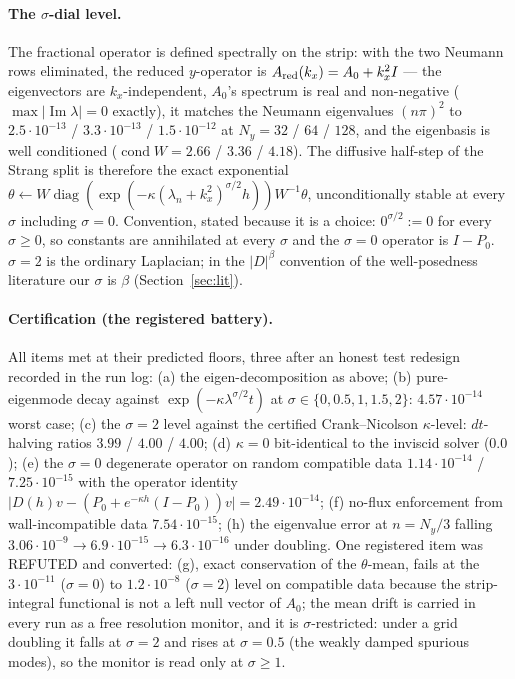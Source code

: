 \documentclass[11pt,a4paper]{article}
\newcommand{\abs}[1]{\lvert #1 \rvert}
\begin{document}
\paragraph{The $\sigma$-dial level.} The fractional operator is defined spectrally on the strip: with the two Neumann rows eliminated, the reduced $y$-operator is $A_{\rm red}(k_x)=A_0+k_x^2I$ --- the eigenvectors are $k_x$-independent, $A_0$'s spectrum is real and non-negative ($\max\abs{\operatorname{Im}\lambda}=0$ exactly), it matches the Neumann eigenvalues $(n\pi)^2$ to $2.5\cdot10^{-13}$ / $3.3\cdot10^{-13}$ / $1.5\cdot10^{-12}$ at $N_y=32$ / $64$ / $128$, and the eigenbasis is well conditioned ($\operatorname{cond}W=2.66$ / $3.36$ / $4.18$). The diffusive half-step of the Strang split is therefore the exact exponential $\theta\leftarrow W\operatorname{diag}(\exp(-\kappa(\lambda_n+k_x^2)^{\sigma/2}h))W^{-1}\theta$, unconditionally stable at every $\sigma$ including $\sigma=0$. Convention, stated because it is a choice: $0^{\sigma/2}:=0$ for every $\sigma\ge0$, so constants are annihilated at every $\sigma$ and the $\sigma=0$ operator is $I-P_0$. $\sigma=2$ is the ordinary Laplacian; in the $\abs D^\beta$ convention of the well-posedness literature our $\sigma$ is $\beta$ (Section~\ref{sec:lit}).

\paragraph{Certification (the registered battery).} All items met at their predicted floors, three after an honest test redesign recorded in the run log: (a) the eigen-decomposition as above; (b) pure-eigenmode decay against $\exp(-\kappa\lambda^{\sigma/2}t)$ at $\sigma\in\{0,0.5,1,1.5,2\}$: $4.57\cdot10^{-14}$ worst case; (c) the $\sigma=2$ level against the certified Crank--Nicolson $\kappa$-level: $dt$-halving ratios $3.99$ / $4.00$ / $4.00$; (d) $\kappa=0$ bit-identical to the inviscid solver ($0.0$); (e) the $\sigma=0$ degenerate operator on random compatible data $1.14\cdot10^{-14}$ / $7.25\cdot10^{-15}$ with the operator identity $\abs{D(h)v-(P_0+e^{-\kappa h}(I-P_0))v}=2.49\cdot10^{-14}$; (f) no-flux enforcement from wall-incompatible data $7.54\cdot10^{-15}$; (h) the eigenvalue error at $n=N_y/3$ falling $3.06\cdot10^{-9}\to6.9\cdot10^{-15}\to6.3\cdot10^{-16}$ under doubling. One registered item was REFUTED and converted: (g), exact conservation of the $\theta$-mean, fails at the $3\cdot10^{-11}$ ($\sigma=0$) to $1.2\cdot10^{-8}$ ($\sigma=2$) level on compatible data because the strip-integral functional is not a left null vector of $A_0$; the mean drift is carried in every run as a free resolution monitor, and it is $\sigma$-restricted: under a grid doubling it falls at $\sigma=2$ and rises at $\sigma=0.5$ (the weakly damped spurious modes), so the monitor is read only at $\sigma\ge1$.
\end{document}
